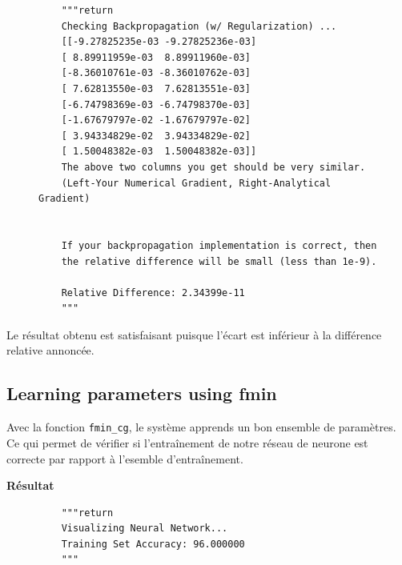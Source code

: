 \begin{figure}[!h]
    \begin{verbatim}
    """return 
    Checking Backpropagation (w/ Regularization) ... 
    [[-9.27825235e-03 -9.27825236e-03]
    [ 8.89911959e-03  8.89911960e-03]
    [-8.36010761e-03 -8.36010762e-03]
    [ 7.62813550e-03  7.62813551e-03]
    [-6.74798369e-03 -6.74798370e-03]
    [-1.67679797e-02 -1.67679797e-02]
    [ 3.94334829e-02  3.94334829e-02]
    [ 1.50048382e-03  1.50048382e-03]]
    The above two columns you get should be very similar.
    (Left-Your Numerical Gradient, Right-Analytical Gradient)


    If your backpropagation implementation is correct, then
    the relative difference will be small (less than 1e-9). 

    Relative Difference: 2.34399e-11
    """
    \end{verbatim}   
\end{figure}

\noindent
Le résultat obtenu est satisfaisant puisque l'écart est inférieur à la différence relative annoncée. 

\subsection{Learning parameters using fmin}

Avec la fonction \texttt{fmin\_cg}, le système apprends un bon ensemble de paramètres. Ce qui permet de vérifier
si l'entraînement de notre réseau de neurone est correcte par rapport à l'esemble d'entraînement. 

\vspace{0.4cm}
\noindent
\textbf{Résultat}

\begin{figure}[!h]
    \begin{verbatim}
    """return 
    Visualizing Neural Network... 
    Training Set Accuracy: 96.000000
    """
    \end{verbatim}   
\end{figure}


